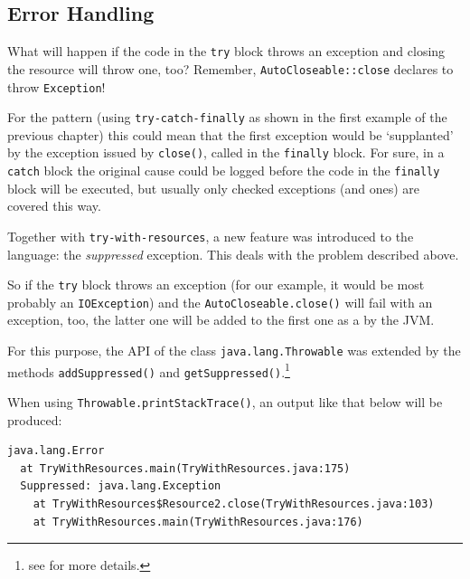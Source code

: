 
\subsection{Error Handling}
What will happen if the code in the \lstinline|try| block throws an exception and closing the resource will throw one, too? Remember, \lstinline|AutoCloseable::close|\autocite{ORACLE_DOC_AUTOCLOSEABLE:close} declares to throw \lstinline|Exception|!

For the  pattern (using \verb#try-catch-finally# as shown in the first example of the previous chapter) this could mean that the first exception would be ‘supplanted’ by the exception issued by \lstinline|close()|, called in the \lstinline|finally| block. For sure, in a \lstinline|catch| block the original cause could be logged before the code in the \lstinline|finally| block will be executed, but usually only checked exceptions (and  ones) are covered this way.

Together with \verb#try-with-resources#, a new feature was introduced to the language: the \textit{suppressed} exception. This deals with the problem described above.

So if the \lstinline|try| block throws an exception (for our example, it would be most probably an \lstinline|IOException|) and the \lstinline|AutoCloseable.close()| will fail with an exception, too, the latter one will be added to the first one as a  by the JVM.

For this purpose, the API of the class \lstinline|java.lang.Throwable| was extended by the methods \lstinline|addSuppressed()|\autocite{ORACLE_DOC_THROWABLE:addSuppressed} and \lstinline|getSuppressed()|\autocite{ORACLE_DOC_THROWABLE:getSuppressed}.\footnote{see \autocite{ORACLE_DOC_THROWABLE_CLASS} for more details.}

When using \lstinline|Throwable.printStackTrace()|\autocite{ORACLE_DOC_THROWABLE:printStackTrace}, an output like that below will be produced:
\begin{lstlisting}
java.lang.Error
  at TryWithResources.main(TryWithResources.java:175)
  Suppressed: java.lang.Exception
    at TryWithResources$Resource2.close(TryWithResources.java:103)
    at TryWithResources.main(TryWithResources.java:176)
\end{lstlisting}

